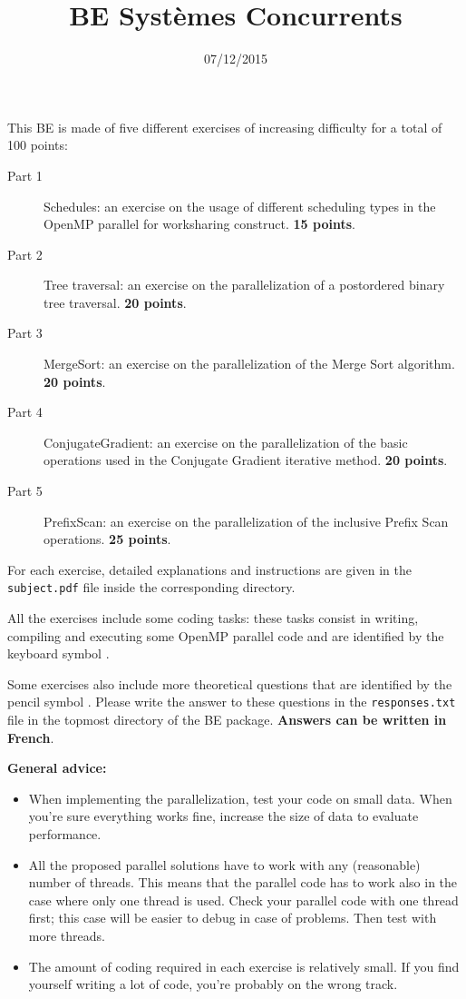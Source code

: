 \documentclass{article}
\date{07/12/2015}
\title{BE Syst\`emes Concurrents}
\begin{document}
\maketitle

This BE is made of five different exercises of increasing difficulty
for a total of 100 points:
\begin{description}
\item[Part 1] Schedules: an exercise on the usage of different
  scheduling types in the OpenMP parallel for worksharing
  construct. {\bf 15 points}.
\item[Part 2] Tree traversal: an exercise on the parallelization of a
  postordered binary tree traversal. {\bf 20 points}.
\item[Part 3] MergeSort: an exercise on the parallelization of the
  Merge Sort algorithm. {\bf 20 points}.
\item[Part 4] ConjugateGradient: an exercise on the parallelization
  of the basic operations used in the Conjugate Gradient iterative
  method. {\bf 20 points}.
\item[Part 5] PrefixScan: an exercise on the parallelization of the
  inclusive Prefix Scan operations. {\bf 25 points}.
\end{description}

For each exercise, detailed explanations and instructions are given in the
\texttt{subject.pdf} file inside the corresponding directory.

All the exercises include some coding tasks: these tasks consist in
writing, compiling and executing some OpenMP parallel code and are
identified by the keyboard symbol {\huge \Keyboard}. 

Some exercises also include more theoretical questions that are
identified by the pencil symbol \smallpencil. Please write the answer
to these questions in the \texttt{responses.txt} file in the topmost
directory of the BE package. {\bf Answers can be written in French}.

\vspace{1cm}

\textbf{General advice:}

\begin{itemize}
\item When implementing the parallelization, test your code on small
  data. When you're sure everything works fine, increase the size of
  data to evaluate performance.
\item All the proposed parallel solutions have to work with any
  (reasonable) number of threads. This means that the parallel code
  has to work also in the case where only one thread is used. Check
  your parallel code with one thread first; this case will be easier
  to debug in case of problems. Then test with more threads.
\item The amount of coding required in each exercise is relatively
  small. If you find yourself writing a lot of code, you're probably
  on the wrong track.
\end{itemize}
\end{document}
